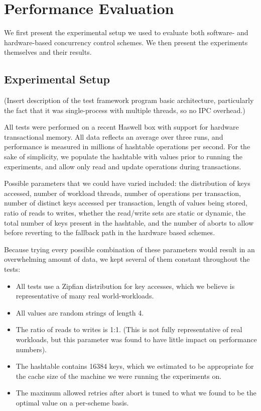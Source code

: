\section{Performance Evaluation} \label{sec:eval}
We first present the experimental setup we used to evaluate both software- and hardware-based concurrency control schemes. We then present the experiments themselves and their results.

\subsection{Experimental Setup}
(Insert description of the test framework program basic architecture,
particularly the fact that it was single-process with multiple threads, so no
IPC overhead.)

All tests were performed on a recent Haswell box with support for hardware
transactional memory. All data reflects an average over three runs, and
performance is measured in millions of hashtable operations per second. For the
sake of simplicity, we populate the hashtable with values prior to running the
experiments, and allow only read and update operations during transactions.

Possible parameters that we could have varied included: the distribution of keys
accessed, number of workload threads, number of operations per transaction,
number of distinct keys accessed per transaction, length of values being stored,
ratio of reads to writes, whether the read/write sets are static or dynamic, the
total number of keys present in the hashtable, and the number of aborts to allow
before reverting to the fallback path in the hardware based schemes.

Because trying every possible combination of these parameters would result in 
an overwhelming amount of data, we kept several of them constant throughout the 
tests:
\begin{itemize}
\item All tests use a Zipfian distribution for key accesses, which we believe is
  representative of many real world-workloads.
\item All values are random strings of length 4.
\item The ratio of reads to writes is 1:1. (This is not fully representative of
  real workloads, but this parameter was found to have little impact on
  performance numbers).
\item The hashtable contains 16384 keys, which we estimated to be appropriate
  for the cache size of the machine we were running the experiments on.
\item The maximum allowed retries after abort is tuned to what we found to be
  the optimal value on a per-scheme basis.
\end{itemize}

